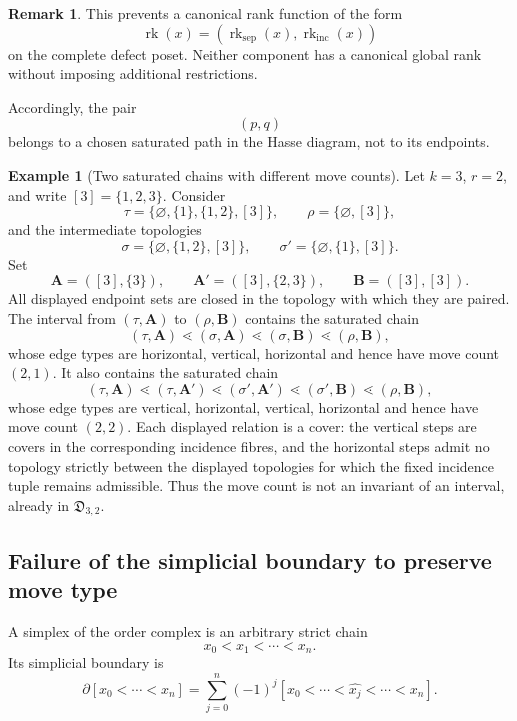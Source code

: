 \documentclass[11pt]{article}
\theoremstyle{plain}
\theoremstyle{definition}
\newtheorem{example}[theorem]{Example}
\newtheorem{remark}[theorem]{Remark}
\begin{document}
\begin{remark}
This prevents a canonical rank function of the form
\[
\operatorname{rk}(x)
=
(\operatorname{rk}_{\mathrm{sep}}(x),
\operatorname{rk}_{\mathrm{inc}}(x))
\]
on the complete defect poset.  Neither component has a canonical
global rank without imposing additional restrictions.
\end{remark}

Accordingly, the pair
\[
(p,q)
\]
belongs to a chosen saturated path in the Hasse diagram, not to its
endpoints.

\begin{example}[Two saturated chains with different move counts]
\label{ex:different-move-counts}
Let $k=3$, $r=2$, and write $[3]=\{1,2,3\}$.  Consider
\[
\tau=\{\varnothing,\{1\},\{1,2\},[3]\},
\qquad
\rho=\{\varnothing,[3]\},
\]
and the intermediate topologies
\[
\sigma=\{\varnothing,\{1,2\},[3]\},
\qquad
\sigma'=\{\varnothing,\{1\},[3]\}.
\]
Set
\[
\mathbf A=([3],\{3\}),
\qquad
\mathbf A'=([3],\{2,3\}),
\qquad
\mathbf B=([3],[3]).
\]
All displayed endpoint sets are closed in the topology with which they are paired.  The interval from $(\tau,\mathbf A)$ to $(\rho,\mathbf B)$ contains the saturated chain
\[
(\tau,\mathbf A)
\lessdot
(\sigma,\mathbf A)
\lessdot
(\sigma,\mathbf B)
\lessdot
(\rho,\mathbf B),
\]
whose edge types are horizontal, vertical, horizontal and hence have move count $(2,1)$.  It also contains the saturated chain
\[
(\tau,\mathbf A)
\lessdot
(\tau,\mathbf A')
\lessdot
(\sigma',\mathbf A')
\lessdot
(\sigma',\mathbf B)
\lessdot
(\rho,\mathbf B),
\]
whose edge types are vertical, horizontal, vertical, horizontal and hence have move count $(2,2)$.  Each displayed relation is a cover: the vertical steps are covers in the corresponding incidence fibres, and the horizontal steps admit no topology strictly between the displayed topologies for which the fixed incidence tuple remains admissible.  Thus the move count is not an invariant of an interval, already in $\mathfrak D_{3,2}$.
\end{example}

\subsection{Failure of the simplicial boundary to preserve move type}
\label{subsec:boundary-obstruction}

A simplex of the order complex is an arbitrary strict chain
\[
x_0<x_1<\cdots<x_n.
\]
Its simplicial boundary is
\[
\partial[x_0<\cdots<x_n]
=
\sum_{j=0}^n
(-1)^j
[x_0<\cdots<\widehat{x_j}<\cdots<x_n].
\]
\end{document}
